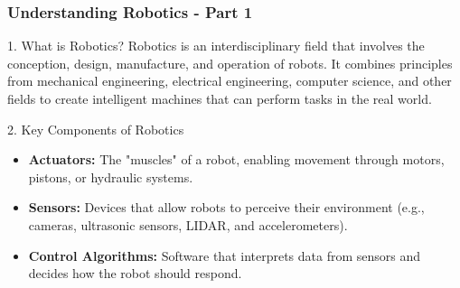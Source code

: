 \documentclass[aspectratio=169]{beamer}
\begin{document}
\begin{frame}[fragile]
    \frametitle{Understanding Robotics - Part 1}
    \begin{block}{1. What is Robotics?}  
        Robotics is an interdisciplinary field that involves the conception, design, manufacture, and operation of robots. It combines principles from mechanical engineering, electrical engineering, computer science, and other fields to create intelligent machines that can perform tasks in the real world.
    \end{block}
    
    \begin{block}{2. Key Components of Robotics}
        \begin{itemize}
            \item \textbf{Actuators:} The "muscles" of a robot, enabling movement through motors, pistons, or hydraulic systems.
            \item \textbf{Sensors:} Devices that allow robots to perceive their environment (e.g., cameras, ultrasonic sensors, LIDAR, and accelerometers).
            \item \textbf{Control Algorithms:} Software that interprets data from sensors and decides how the robot should respond.
        \end{itemize}
    \end{block}
\end{frame}
\end{document}

